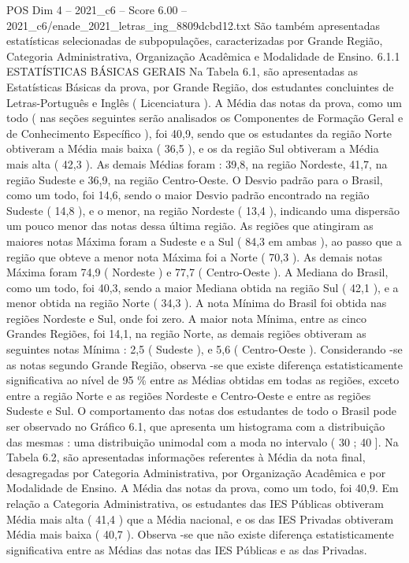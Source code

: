 \begin{textsample}{POS Dim 4 – 2021\_c6 – Score 6.00 – 2021\_c6/enade\_2021\_letras\_ing\_8809dcbd12.txt}
São também apresentadas estatísticas selecionadas de subpopulações, caracterizadas por Grande Região, Categoria Administrativa, Organização Acadêmica e Modalidade de Ensino. 6.1.1 ESTATÍSTICAS BÁSICAS GERAIS Na Tabela 6.1, são apresentadas as Estatísticas Básicas da prova, por Grande Região, dos estudantes concluintes de Letras-Português e Inglês ( Licenciatura ).
A Média das notas da prova, como um todo ( nas seções seguintes serão analisados os Componentes de Formação Geral e de Conhecimento Específico ), foi 40,9, sendo que os estudantes da região Norte obtiveram a Média mais baixa ( 36,5 ), e os da região Sul obtiveram a Média mais alta ( 42,3 ).
As demais Médias foram : 39,8, na região Nordeste, 41,7, na região Sudeste e 36,9, na região Centro-Oeste.
O Desvio padrão para o Brasil, como um todo, foi 14,6, sendo o maior Desvio padrão encontrado na região Sudeste ( 14,8 ), e o menor, na região Nordeste ( 13,4 ), indicando uma dispersão um pouco menor das notas dessa última região.
As regiões que atingiram as maiores notas Máxima foram a Sudeste e a Sul ( 84,3 em ambas ), ao passo que a região que obteve a menor nota Máxima foi a Norte ( 70,3 ).
As demais notas Máxima foram 74,9 ( Nordeste ) e 77,7 ( Centro-Oeste ).
A Mediana do Brasil, como um todo, foi 40,3, sendo a maior Mediana obtida na região Sul ( 42,1 ), e a menor obtida na região Norte ( 34,3 ).
A nota Mínima do Brasil foi obtida nas regiões Nordeste e Sul, onde foi zero.
A maior nota Mínima, entre as cinco Grandes Regiões, foi 14,1, na região Norte, as demais regiões obtiveram as seguintes notas Mínima : 2,5 ( Sudeste ), e 5,6 ( Centro-Oeste ).
Considerando -se as notas segundo Grande Região, observa -se que existe diferença estatisticamente significativa ao nível de 95 \% entre as Médias obtidas em todas as regiões, exceto entre a região Norte e as regiões Nordeste e Centro-Oeste e entre as regiões Sudeste e Sul.
O comportamento das notas dos estudantes de todo o Brasil pode ser observado no Gráfico 6.1, que apresenta um histograma com a distribuição das mesmas : uma distribuição unimodal com a moda no intervalo ( 30 ; 40 ].
Na Tabela 6.2, são apresentadas informações referentes à Média da nota final, desagregadas por Categoria Administrativa, por Organização Acadêmica e por Modalidade de Ensino.
A Média das notas da prova, como um todo, foi 40,9.
Em relação a Categoria Administrativa, os estudantes das IES Públicas obtiveram Média mais alta ( 41,4 ) que a Média nacional, e os das IES Privadas obtiveram Média mais baixa ( 40,7 ).
Observa -se que não existe diferença estatisticamente significativa entre as Médias das notas das IES Públicas e as das Privadas.

\end{textsample}
